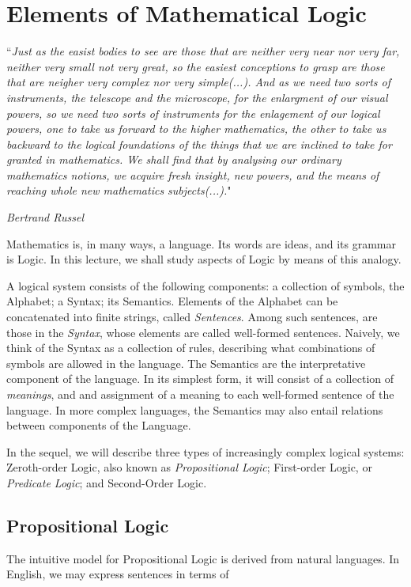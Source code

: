 \chapter{Elements of Mathematical Logic}

\epigraph{``\textit{Just as the easist bodies to see are those that are neither very near nor very far, neither very small not very great, so the easiest conceptions to grasp are those that are neigher very complex nor very simple(...). And as we need two sorts of instruments, the telescope and the microscope, for the enlargment of our visual powers, so we need two sorts of instruments for the enlagement of our logical powers, one to take us forward to the higher mathematics, the other to take us backward to the logical foundations of the things that we are inclined to take for granted in mathematics. We shall find that by analysing our ordinary mathematics notions, we acquire fresh insight, new powers, and the means of reaching whole new mathematics subjects(...).}"}{\textit{Bertrand Russel}}

Mathematics is, in many ways, a language. Its words are ideas, and its grammar is Logic. In this lecture, we shall study aspects of Logic by means of this analogy. 

A logical system consists of the following components: a collection of symbols, the Alphabet; a Syntax; its Semantics. Elements of the Alphabet can be concatenated into finite strings, called \textit{Sentences}. Among such sentences, are those in the \textit{Syntax}, whose elements are called well-formed sentences. Naively, we think of the Syntax as a collection of rules, describing what combinations of symbols are allowed in the language. The Semantics are the interpretative component of the language. In its simplest form, it will consist of a collection of \textit{meanings}, and and assignment of a meaning to each well-formed sentence of the language. In more complex languages, the Semantics may also entail relations between components of the Language. 

In the sequel, we will describe three types of increasingly complex logical systems: Zeroth-order Logic, also known as \textit{Propositional Logic}; First-order Logic, or \textit{Predicate Logic}; and Second-Order Logic. 

\section{Propositional Logic}

The intuitive model for Propositional Logic is derived from natural languages. In English, we may express sentences in terms of 

